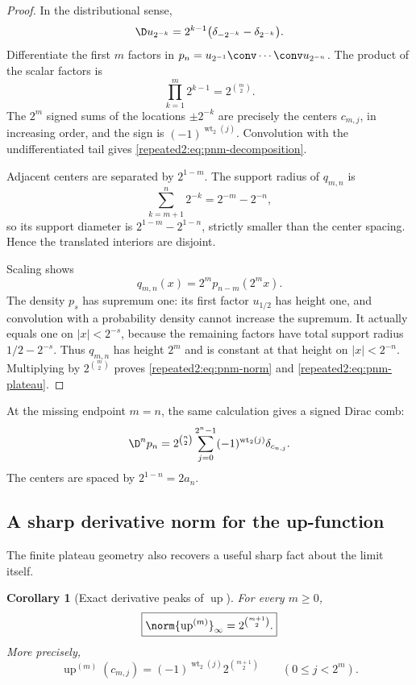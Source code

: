 \documentclass[11pt,oneside]{article}
\newtheorem{corollary}[theorem]{Corollary}
\theoremstyle{definition}
\theoremstyle{remark}
\newcommand{\Up}{\operatorname{up}}
\newcommand{\wt}{\operatorname{wt}_2}
\begin{document}
\begin{proof}
In the distributional sense,
\begin{equation}
 \D u_{2^{-k}}=2^{k-1}\bigl(\delta_{-2^{-k}}-\delta_{2^{-k}}\bigr).
 \label{repeated2:eq:uniform-derivative-delta}
\end{equation}
Differentiate the first $m$ factors in
$p_n=u_{2^{-1}}\conv\cdots\conv u_{2^{-n}}$.  The product of the scalar factors is
\[
 \prod_{k=1}^{m}2^{k-1}=2^{\binom m2}.
\]
The $2^m$ signed sums of the locations $\pm2^{-k}$ are precisely the centers
$c_{m,j}$, in increasing order, and the sign is $(-1)^{\wt(j)}$.  Convolution with the
undifferentiated tail gives \eqref{repeated2:eq:pnm-decomposition}.

Adjacent centers are separated by $2^{1-m}$.  The support radius of $q_{m,n}$ is
\[
 \sum_{k=m+1}^{n}2^{-k}=2^{-m}-2^{-n},
\]
so its support diameter is $2^{1-m}-2^{1-n}$, strictly smaller than the center spacing.
Hence the translated interiors are disjoint.

Scaling shows
\begin{equation}
 q_{m,n}(x)=2^m p_{n-m}(2^mx).
 \label{repeated2:eq:qmn-scaling}
\end{equation}
The density $p_s$ has supremum one: its first factor $u_{1/2}$ has height one, and
convolution with a probability density cannot increase the supremum.  It actually equals
one on $|x|<2^{-s}$, because the remaining factors have total support radius
$1/2-2^{-s}$.  Thus $q_{m,n}$ has height $2^m$ and is constant at that height on
$|x|<2^{-n}$.  Multiplying by $2^{\binom m2}$ proves
\eqref{repeated2:eq:pnm-norm} and \eqref{repeated2:eq:pnm-plateau}.
\end{proof}

At the missing endpoint $m=n$, the same calculation gives a signed Dirac comb:
\begin{equation}
 \D^np_n=2^{\binom n2}
 \sum_{j=0}^{2^n-1}(-1)^{\wt(j)}\delta_{c_{n,j}}.
 \label{repeated2:eq:pn-top-delta-comb}
\end{equation}
The centers are spaced by $2^{1-n}=2a_n$.

\subsection{A sharp derivative norm for the up-function}

The finite plateau geometry also recovers a useful sharp fact about the limit itself.

\begin{corollary}[Exact derivative peaks of $\Up$]
\label{repeated2:cor:up-derivative-norm}
For every $m\ge0$,
\begin{equation}
 \boxed{\displaystyle
 \norm{\Up^{(m)}}_\infty=2^{\binom{m+1}{2}}.}
 \label{repeated2:eq:up-derivative-norm}
\end{equation}
More precisely,
\begin{equation}
 \Up^{(m)}(c_{m,j})=(-1)^{\wt(j)}2^{\binom{m+1}{2}}
 \qquad(0\le j<2^m).
 \label{repeated2:eq:up-derivative-peaks}
\end{equation}
\end{corollary}
\end{document}
